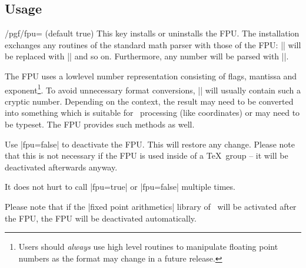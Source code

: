 \subsection{Usage}
\begin{key}{/pgf/fpu= (default true)}
	This key installs or uninstalls the FPU. The installation exchanges any routines of the standard math parser with those of the FPU: |\pgfmathadd| will be replaced with |\pgfmathfloatadd| and so on. Furthermore, any number will be parsed with |\pgfmathfloatparsenumber|.

\begin{codeexample}[]
\pgfmathresult
\end{codeexample}
\noindent The FPU uses a lowlevel number representation consisting of flags, mantissa and exponent\footnote{Users should \emph{always} use high level routines to manipulate floating point numbers as the format may change in a future release.}. To avoid unnecessary format conversions, |\pgfmathresult| will usually contain such a cryptic number. Depending on the context, the result may need to be converted into something which is suitable for \pgfname\ processing (like coordinates) or may need to be typeset. The FPU provides such methods as well.


	Use |fpu=false| to deactivate the FPU. This will restore any change. Please note that this is not necessary if the FPU is used inside of a \TeX\ group -- it will be deactivated afterwards anyway.

	It does not hurt to call |fpu=true| or |fpu=false| multiple times.

	Please note that if the |fixed point arithmetics| library of \pgfname\ will be activated after the FPU, the FPU will be deactivated automatically.
\end{key}

